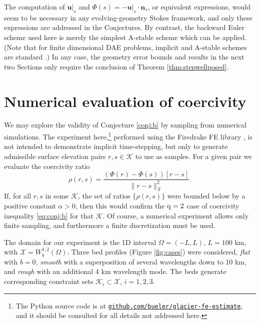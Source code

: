 \documentclass[hidelinks,onefignum,onetabnum,final]{siamart220329}  %
\newcommand{\bn}{\mathbf{n}}
\newcommand{\bu}{\mathbf{u}}
\newcommand{\cK}{\mathcal{K}}
\newcommand{\cX}{\mathcal{X}}
\newcommand{\qq}{{\text{\textnormal{q}}}}
\begin{document}
The computation of $\bu|_s$ and $\Phi(s)=-\bu|_s\cdot \bn_s$, or equivalent expressions, would seem to be necessary in any evolving-geometry Stokes framework, and only these expressions are addressed in the Conjectures.  By contrast, the backward Euler scheme used here is merely the simplest A-stable \cite{AscherPetzold1998} scheme which can be applied.  (Note that for finite dimensional DAE problems, implicit and A-stable schemes are standard \cite{AscherPetzold1998}.)  In any case, the geometry error bounds and results in the next two Sections only require the conclusion of Theorem \ref{thm:stepwellposed}.


\section{Numerical evaluation of coercivity} \label{sec:numerical}

We may explore the validity of Conjecture \ref{conj:b} by sampling from numerical simulations.  The experiment here,\footnote{The Python source code is at \href{https://github.com/bueler/glacier-fe-estimate}{\texttt{github.com/bueler/glacier-fe-estimate}}, and it should be consulted for all details not addressed here.} performed using the Firedrake FE library \cite{Hametal2023}, is not intended to demonstrate implicit time-stepping, but only to generate admissible surface elevation pairs $r,s\in\cK$ to use as samples.  For a given pair we evaluate the coercivity ratio
\begin{equation}
\rho(r,s) = \frac{\left(\Phi(r) - \Phi(s)\right)[r-s]}{\|r-s\|_{\cX}^2}. \label{eq:Phiratio}
\end{equation}
If, for all $r,s$ in some $\cK$, the set of ratios $\{\rho(r,s)\}$ were bounded below by a positive constant $\alpha>0$, then this would confirm the $\qq=2$ case of coercivity inequality \eqref{eq:conj:b} for that $\cK$.  Of course, a numerical experiment allows only finite sampling, and furthermore a finite discretization must be used.

The domain for our experiment is the 1D interval $\Omega=(-L,L)$, $L=100$ km, with $\cX = W_b^{1,2}(\Omega)$.  Three bed profiles  (Figure \ref{fig:cases}) were considered, \emph{flat} with $b=0$, \emph{smooth} with a superposition of several wavelengths down to 10 km, and \emph{rough} with an additional 4 km wavelength mode.  The beds generate corresponding constraint sets $\cK_i \subset \cX$, $i=1,2,3$.
\end{document}
